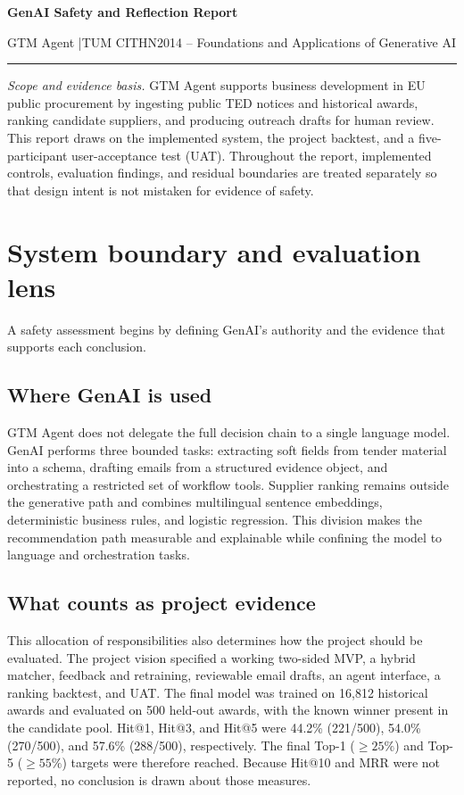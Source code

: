 \documentclass[10pt,a4paper]{article}
\begin{document}
{\LARGE\bfseries GenAI Safety and Reflection Report}\par\vspace{-1pt}
{\small GTM Agent \quad|\quad TUM \textbar{} CITHN2014 -- Foundations and Applications of Generative AI}\par\vspace{4pt}
\hrule\vspace{3pt}
\setcounter{tocdepth}{2}
\tableofcontents
\clearpage

\textit{Scope and evidence basis.} GTM Agent supports business development in EU public procurement by ingesting public TED notices and historical awards, ranking candidate suppliers, and producing outreach drafts for human review. This report draws on the implemented system, the project backtest, and a five-participant user-acceptance test (UAT). Throughout the report, implemented controls, evaluation findings, and residual boundaries are treated separately so that design intent is not mistaken for evidence of safety.

\section{System boundary and evaluation lens}

A safety assessment begins by defining GenAI's authority and the evidence that supports each conclusion.

\subsection{Where GenAI is used}
GTM Agent does not delegate the full decision chain to a single language model. GenAI performs three bounded tasks: extracting soft fields from tender material into a schema, drafting emails from a structured evidence object, and orchestrating a restricted set of workflow tools. Supplier ranking remains outside the generative path and combines multilingual sentence embeddings, deterministic business rules, and logistic regression. This division makes the recommendation path measurable and explainable while confining the model to language and orchestration tasks.

\subsection{What counts as project evidence}
This allocation of responsibilities also determines how the project should be evaluated. The project vision specified a working two-sided MVP, a hybrid matcher, feedback and retraining, reviewable email drafts, an agent interface, a ranking backtest, and UAT. The final model was trained on 16,812 historical awards and evaluated on 500 held-out awards, with the known winner present in the candidate pool. Hit@1, Hit@3, and Hit@5 were 44.2\% (221/500), 54.0\% (270/500), and 57.6\% (288/500), respectively. The final Top-1 ($\geq25\%$) and Top-5 ($\geq55\%$) targets were therefore reached. Because Hit@10 and MRR were not reported, no conclusion is drawn about those measures.
\end{document}
